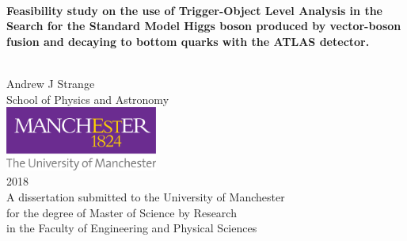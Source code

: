 \ifpdf
\fi
%
%
\begin{center}
 \qquad\\[0mm]
 {\renewcommand\baselinestretch{1.2}\huge\textbf{
%
%
   Feasibility study on the use of Trigger-Object Level Analysis in the Search for the Standard Model Higgs boson produced by vector-boson fusion and decaying to bottom quarks with the ATLAS detector.
%
 }\par}
 \qquad\\[20mm]
 {\LARGE Andrew J Strange}\\[10mm]
 {\large School of Physics and Astronomy}\\[10mm]
 \includegraphics[width=50mm]{UniOfManchesterLogo.png}\\[30mm]
 {\Large 2018}\\[10mm]
 {\large A dissertation submitted to the University of Manchester \\ for the degree of Master of Science by Research \\ in the Faculty of Engineering and Physical Sciences}
\end{center}

\cleardoublepage

\endinput
